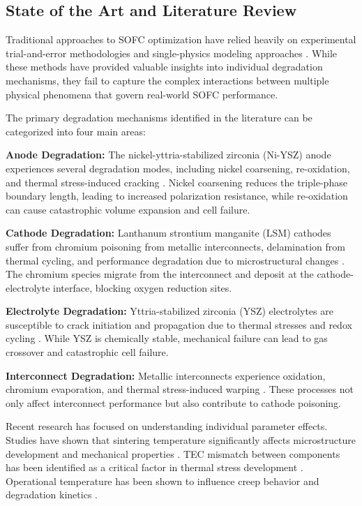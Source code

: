 \documentclass[conference]{IEEEtran}
\begin{document}
\subsection{State of the Art and Literature Review}

Traditional approaches to SOFC optimization have relied heavily on experimental trial-and-error methodologies and single-physics modeling approaches \cite{selcuk2000modelling}. While these methods have provided valuable insights into individual degradation mechanisms, they fail to capture the complex interactions between multiple physical phenomena that govern real-world SOFC performance.

The primary degradation mechanisms identified in the literature can be categorized into four main areas:

\textbf{Anode Degradation:} The nickel-yttria-stabilized zirconia (Ni-YSZ) anode experiences several degradation modes, including nickel coarsening, re-oxidation, and thermal stress-induced cracking \cite{tu2019progress}. Nickel coarsening reduces the triple-phase boundary length, leading to increased polarization resistance, while re-oxidation can cause catastrophic volume expansion and cell failure.

\textbf{Cathode Degradation:} Lanthanum strontium manganite (LSM) cathodes suffer from chromium poisoning from metallic interconnects, delamination from thermal cycling, and performance degradation due to microstructural changes \cite{jiang2012chromium}. The chromium species migrate from the interconnect and deposit at the cathode-electrolyte interface, blocking oxygen reduction sites.

\textbf{Electrolyte Degradation:} Yttria-stabilized zirconia (YSZ) electrolytes are susceptible to crack initiation and propagation due to thermal stresses and redox cycling \cite{selcuk2000modelling}. While YSZ is chemically stable, mechanical failure can lead to gas crossover and catastrophic cell failure.

\textbf{Interconnect Degradation:} Metallic interconnects experience oxidation, chromium evaporation, and thermal stress-induced warping \cite{yang2003evaluation}. These processes not only affect interconnect performance but also contribute to cathode poisoning.

Recent research has focused on understanding individual parameter effects. Studies have shown that sintering temperature significantly affects microstructure development and mechanical properties \cite{selcuk2000modelling}. TEC mismatch between components has been identified as a critical factor in thermal stress development \cite{selcuk2000modelling}. Operational temperature has been shown to influence creep behavior and degradation kinetics \cite{tu2019progress}.
\end{document}
